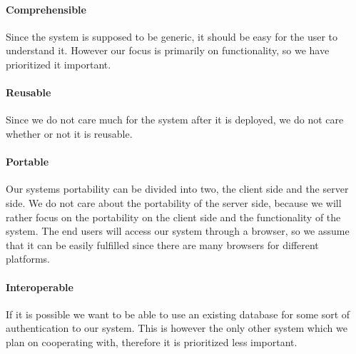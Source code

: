 \paragraph{Comprehensible}
Since the \hdesk[] system is supposed to be generic, it should be easy for the user to understand it.
However our focus is primarily on functionality, so we have prioritized it important.
\paragraph{Reusable}
Since we do not care much for the system after it is deployed, we do not care whether or not it is reusable.
\paragraph{Portable}
Our systems portability can be divided into two, the client side and the server side.
We do not care about the portability of the server side, because we will rather focus on the portability on the client side and the functionality of the system.
The end users will access our system through a browser, so we assume that it can be easily fulfilled since there are many browsers for different platforms. \cite{chrome10}
\paragraph{Interoperable}
If it is possible we want to be able to use an existing database for some sort of authentication to our system.
This is however the only other system which we plan on cooperating with, therefore it is prioritized less important.